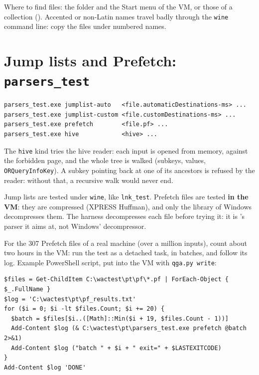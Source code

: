 \documentclass[11pt,a4paper,oneside]{report}
\begin{document}
Where to find files: the  folder and the Start menu of the VM,
or those of a collection (). Accented or non-Latin
names travel badly through the \texttt{wine} command line: copy the files under
numbered names.

\section{Jump lists and Prefetch: \texttt{parsers\_test}}\label{sec:parsers}

\begin{lstlisting}
parsers_test.exe jumplist-auto   <file.automaticDestinations-ms> ...
parsers_test.exe jumplist-custom <file.customDestinations-ms> ...
parsers_test.exe prefetch        <file.pf> ...
parsers_test.exe hive            <hive> ...
\end{lstlisting}

The \texttt{hive} kind tries the hive reader: each input is opened from memory,
against the forbidden page, and the whole tree is walked (subkeys, values,
\texttt{ORQueryInfoKey}). A subkey pointing back at one of its ancestors is
refused by the reader: without that, a recursive walk would never end.

Jump lists are tested under \texttt{wine}, like \texttt{lnk\_test}. Prefetch files
are tested \textbf{in the VM}: they are compressed (XPRESS Huffman), and only the
 library of Windows decompresses them. The harness decompresses
each file before trying it: it is \wac{}'s parser it aims at, not Windows'
decompressor.

For the 307 Prefetch files of a real machine (over a million inputs), count about
two hours in the VM: run the test as a detached task, in batches, and follow its
log. Example PowerShell script, put into the VM with \texttt{qga.py write}:

\begin{lstlisting}
$files = Get-ChildItem C:\wactest\pt\pf\*.pf | ForEach-Object { $_.FullName }
$log = 'C:\wactest\pt\pf_results.txt'
for ($i = 0; $i -lt $files.Count; $i += 20) {
  $batch = $files[$i..([Math]::Min($i + 19, $files.Count - 1))]
  Add-Content $log (& C:\wactest\pt\parsers_test.exe prefetch @batch 2>&1)
  Add-Content $log ("batch " + $i + " exit=" + $LASTEXITCODE)
}
Add-Content $log 'DONE'
\end{lstlisting}
\end{document}
